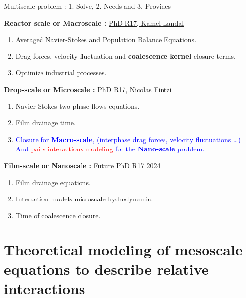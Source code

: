 \documentclass{sintefbeamer}
\begin{document}
\begin{frame}{Multiscale problem : 1. Solve, 2. Needs and 3. Provides}
  
	\textbf{Reactor scale or Macroscale :} 
    \hfill\underline{PhD R17, Kamel Landal}
    \begin{enumerate}
      \item Averaged Navier-Stokes and Population Balance Equations. 
      \item Drag forces, velocity fluctuation and \textbf{coalescence kernel} closure terms. 
      \item Optimize industrial processes. 
    \end{enumerate}

    \textbf{Drop-scale or Microscale : } 
    \hfill\underline{PhD R17, Nicolas Fintzi}
    \begin{enumerate}
      \item Navier-Stokes two-phase flows equations. 
      \item Film drainage time.  
      \item \textcolor{blue}{Closure for \textbf{Macro-scale}, (interphase drag forces, velocity fluctuations \ldots) And \textcolor{red}{pairs interactions modeling} for the \textbf{Nano-scale}  problem.}  
    \end{enumerate}

    \textbf{Film-scale or Nanoscale :}
    \hfill\underline{Future PhD R17 2024}
	\begin{enumerate}
		\item Film drainage equations. 
		\item Interaction models microscale hydrodynamic.   
		\item Time of coalescence closure.  
	\end{enumerate}
  \centering
\end{frame}

\section{Theoretical modeling of mesoscale equations to describe relative interactions}
\end{document}

